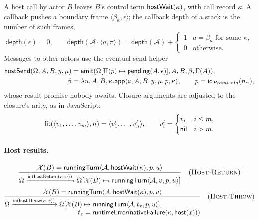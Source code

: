 A host call by actor $B$ leaves $B$'s control term $\mathsf{hostWait}(\kappa)$,
with call record $\kappa$.  A callback pushes a boundary frame
$\langle\beta_\kappa,\epsilon\rangle$; the callback depth of a stack is the
number of such frames,
\begin{equation}\label{eq:callback-depth}
 \mathsf{depth}(\epsilon)=0,\qquad
 \mathsf{depth}(\mathcal A\cdot\langle a,\pi\rangle)=
 \mathsf{depth}(\mathcal A)+
 \begin{cases}1 & a=\beta_\kappa\text{ for some }\kappa,\\
              0 & \text{otherwise.}\end{cases}
\end{equation}
Messages to other actors use the eventual-send helper
\begin{equation}\label{eq:host-send}
\begin{aligned}
 \mathsf{hostSend}(\Omega,A,B,y,\mu)={}&
 \mathsf{emit}(\Omega[\Pi(p)\mapsto\mathsf{pending}(A,\epsilon)],A,B,\beta,
   \Gamma(A)),\\
 \beta={}&\lambda u,A,B,\kappa.\mathsf{app}\langle u,A,B,y,\mu,p,\kappa\rangle,
 \qquad p=\mathsf{id}_{\mathit{PromiseId}}(n_\alpha),
\end{aligned}
\end{equation}
whose result promise nobody awaits.  Closure arguments are adjusted to the
closure's arity, as in JavaScript:
\begin{equation}\label{eq:callback-arguments}
 \mathsf{fit}(\langle v_1,\ldots,v_m\rangle,n)=
 \langle v'_1,\ldots,v'_n\rangle,
 \qquad
 v'_i=\begin{cases}v_i & i\le m,\\ \mathsf{nil} & i>m.\end{cases}
\end{equation}

\paragraph{Host results.}
\[
\dfrac{\mathcal X(B)=\mathsf{runningTurn}\langle\mathcal A,\mathsf{hostWait}(\kappa),p,u\rangle}
 {\Omega\xrightarrow{\mathsf{in}(\mathsf{hostReturn}(\kappa,v))}
  \Omega[\mathcal X(B)\mapsto\mathsf{runningTurn}\langle\mathcal A,v,p,u\rangle]}
\quad(\textsc{Host-Return})
\]
\[
\dfrac{\mathcal X(B)=\mathsf{runningTurn}\langle\mathcal A,\mathsf{hostWait}(\kappa),p,u\rangle}
 {\begin{aligned}
  \Omega\xrightarrow{\mathsf{in}(\mathsf{hostThrow}(\kappa,x))}
  \Omega[\mathcal X(B)\mapsto{}&\mathsf{runningTurn}\langle\mathcal A,
     t_x,p,u\rangle],\\[-1mm]
  t_x={}&\mathsf{runtimeError}(\mathsf{nativeFailure}(\kappa,\mathsf{host}(x)))
 \end{aligned}}
\quad(\textsc{Host-Throw})
\]

